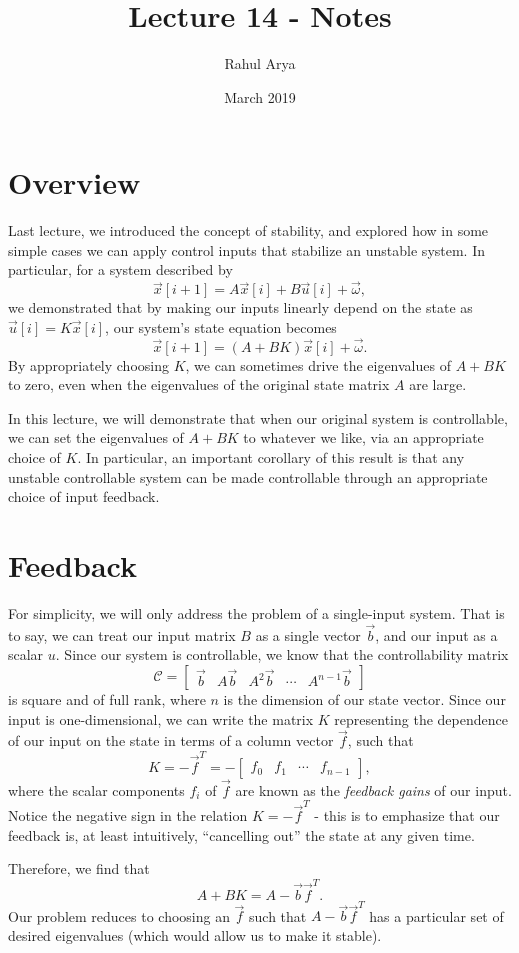 \documentclass[letterpaper]{article}
\title{Lecture 14 - Notes}
\author{Rahul Arya}
\date{March 2019}
\theoremstyle{remark}
\newcommand{\mat}[1]{\ensuremath{\begin{bmatrix}#1\end{bmatrix}}}
\begin{document}
\maketitle

\section{Overview}
Last lecture, we introduced the concept of stability, and explored how in some simple cases we can apply control inputs that stabilize an unstable system. In particular, for a system described by
\[
    \vec{x}[i + 1] = A\vec{x}[i] + B\vec{u}[i] + \vec{\omega},
\]
we demonstrated that by making our inputs linearly depend on the state as $\vec{u}[i] = K\vec{x}[i]$, our system's state equation becomes
\[
    \vec{x}[i + 1] = (A + BK)\vec{x}[i] + \vec{\omega}.
\]
By appropriately choosing $K$, we can sometimes drive the eigenvalues of $A + BK$ to zero, even when the eigenvalues of the original state matrix $A$ are large.

In this lecture, we will demonstrate that when our original system is controllable, we can set the eigenvalues of $A + BK$ to whatever we like, via an appropriate choice of $K$. In particular, an important corollary of this result is that any unstable controllable system can be made controllable through an appropriate choice of input feedback.

\section{Feedback}
For simplicity, we will only address the problem of a single-input system. That is to say, we can treat our input matrix $B$ as a single vector $\vec{b}$, and our input as a scalar $u$. Since our system is controllable, we know that the controllability matrix
\[
    \mathscr{C} = \mat{\vec{b} & A\vec{b} & A^2\vec{b} & \cdots & A^{n - 1}\vec{b}}
\]
is square and of full rank, where $n$ is the dimension of our state vector. Since our input is one-dimensional, we can write the matrix $K$ representing the dependence of our input on the state in terms of a column vector $\vec{f}$, such that
\[
    K = -\vec{f}^T = -\mat{f_0 & f_1 & \cdots & f_{n - 1}},
\]
where the scalar components $f_i$ of $\vec{f}$ are known as the \emph{feedback gains} of our input. Notice the negative sign in the relation $K = -\vec{f}^T$ - this is to emphasize that our feedback is, at least intuitively, ``cancelling out'' the state at any given time.

Therefore, we find that
\[
    A + BK = A - \vec{b} \vec{f}^T.
\]
Our problem reduces to choosing an $\vec{f}$ such that $A - \vec{b}\vec{f}^T$ has a particular set of desired eigenvalues (which would allow us to make it stable).
\end{document}
